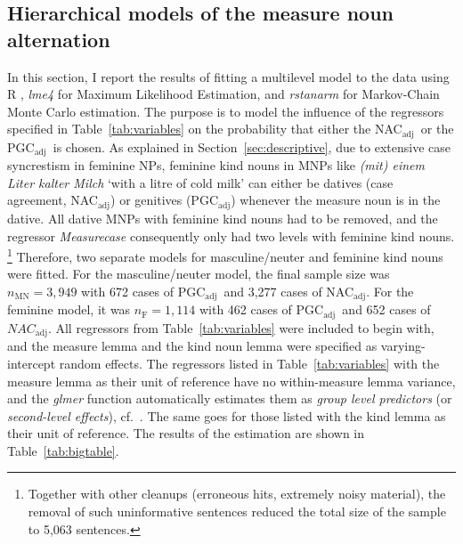 \documentclass[USenglish]{article}
\newcommand{\Sub}[1]{\ensuremath{\mathrm{_{#1}}}}
\newcommand{\NACa}{NAC\Sub{adj}}
\newcommand{\PGCa}{PGC\Sub{adj}}
\begin{document}


\subsection{Hierarchical models of the measure noun alternation}
\label{sec:corpushierarchicalmodel}

In this section, I report the results of fitting a multilevel model to the data using R \citep{R}, \textit{lme4} \citep{lme4} for Maximum Likelihood Estimation, and \textit{rstanarm} \citep{rstanarm} for Markov-Chain Monte Carlo estimation.
The purpose is to model the influence of the regressors specified in Table~\ref{tab:variables} on the probability that either the \NACa\ or the \PGCa\ is chosen.
As explained in Section~\ref{sec:descriptive}, due to extensive case syncrestism in feminine NPs, feminine kind nouns in MNPs like \textit{(mit) einem Liter kalter Milch} `with a litre of cold milk' can either be datives (case agreement, \NACa) or genitives (\PGCa) whenever the measure noun is in the dative.
All dative MNPs with feminine kind nouns had to be removed, and the regressor \textit{Measurecase} consequently only had two levels with feminine kind nouns.%
\footnote{Together with other cleanups (erroneous hits, extremely noisy material), the removal of such uninformative sentences reduced the total size of the sample to 5,063 sentences.}
Therefore, two separate models for masculine\slash neuter and feminine kind nouns were fitted.
For the masculine\slash neuter model, the final sample size was $n_{\text{MN}}=3,949$ with 672 cases of \PGCa\ and 3,277 cases of \NACa.
For the feminine model, it was $n_{\text{F}}=1,114$ with 462 cases of \PGCa\ and 652 cases of $\NACa$.
All regressors from Table~\ref{tab:variables} were included to begin with, and the measure lemma and the kind noun lemma were specified as varying-intercept random effects.
The regressors listed in Table~\ref{tab:variables} with the measure lemma as their unit of reference have no within-measure lemma variance, and the \textit{glmer} function automatically estimates them as \textit{group level predictors} (or \textit{second-level effects}), cf.\ \cite[265--269,302--304]{GelmanHill2006}.
The same goes for those listed with the kind lemma as their unit of reference.
The results of the estimation are shown in Table~\ref{tab:bigtable}.


\end{document}
